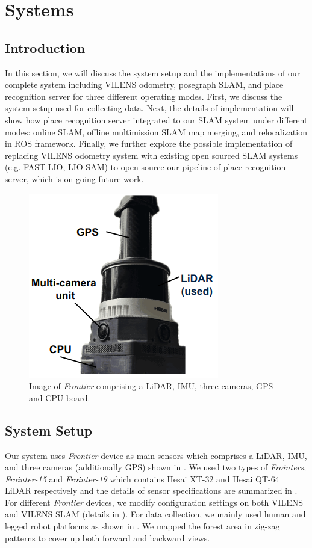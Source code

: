 \chapter{Systems}
\label{ch:system}
\section{Introduction}
In this section, we will discuss the system setup and the implementations of our complete system including VILENS odometry, posegraph SLAM, and place recognition server for three different operating modes. First, we discuss the system setup used for collecting data. Next, the details of implementation will show how place recognition server integrated to our SLAM system under different modes: online SLAM, offline multimission SLAM map merging, and relocalization in ROS framework. Finally, we further explore the possible implementation of replacing VILENS odometry system with existing open sourced SLAM systems (e.g. FAST-LIO, LIO-SAM) to open source our pipeline of place recognition server, which is on-going future work. 

\begin{figure}[t]
  \centering
  \includegraphics[width=0.4\columnwidth]{pics/setup_Frontier_pic2.png}
  \caption{Image of \emph{Frontier} comprising a LiDAR, IMU, three cameras, GPS and CPU board. }
  \label{fig:frontier}
\end{figure}

\section{System Setup}
\label{sec:system_setup}
Our system uses \emph{Frontier} device as main sensors which comprises a LiDAR, IMU, and three cameras (additionally GPS) shown in . We used two types of \emph{Frointers}, \emph{Frointer-15} and \emph{Frointer-19} which contains Hesai XT-32 and Hesai QT-64 LiDAR respectively and the details of sensor specifications are summarized in . For different \emph{Frontier} devices, we modify configuration settings on both VILENS and VILENS SLAM (details in \cite{wisth2023tro,proudman2022ras}). For data collection, we mainly used human and legged robot platforms as shown in . We mapped the forest area in zig-zag patterns to cover up both forward and backward views. 



